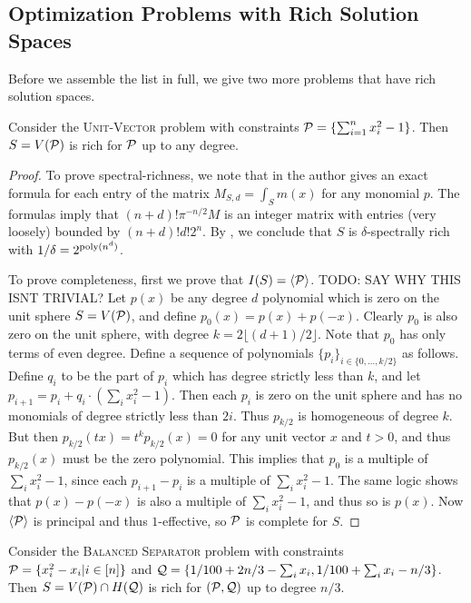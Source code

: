 \subsection{Optimization Problems with Rich Solution Spaces}
Before we assemble the list in full, we give two more problems that have rich solution spaces.
\begin{lemma}
Consider the \textsc{Unit-Vector} problem with constraints $\mathcal P = \{\sum_{i=1}^n x_i^2 - 1\}$. Then $S = V(\mathcal P)$ is rich for $\mathcal P$ up to any degree. 
\end{lemma}
\begin{proof}
To prove spectral-richness, we note that in \cite{10.2307/2695802} the author gives an exact formula for each entry of the matrix $M_{S,d} = \int_{S} m(x)$ for any monomial $p$. The formulas imply that $(n+d)!\pi^{-n/2} M$ is an integer matrix with entries (very loosely) bounded by $(n+d)!d!2^n$. By , we conclude that $S$ is $\delta$-spectrally rich with $1/\delta = 2^{\operatorname{poly}(n^d)}$.

To prove completeness, first we prove that $I(S) = \langle \mathcal P \rangle$. TODO: SAY WHY THIS ISNT TRIVIAL? Let $p(x)$ be any degree $d$ polynomial which is zero on the unit sphere $S = V(\mathcal P)$, and define $p_0(x) = p(x) + p(-x)$. Clearly $p_0$ is also zero on the unit sphere, with degree $k = 2\lfloor (d+1)/2 \rfloor$. Note that $p_0$ has only terms of even degree. 
%
Define a sequence of polynomials $\{p_i\}_{i \in \{0,\ldots, k/2\}}$ as follows.
Define $q_i$ to be the part of $p_i$ which has degree strictly less than $k$, and let $p_{i+1} = p_i + q_i\cdot(\sum_i x_i^2 - 1)$. Then each $p_i$ is zero on the unit sphere and has no monomials of degree strictly less than $2i$. Thus $p_{k/2}$ is homogeneous of degree $k$. But then $p_{k/2}(tx) = t^kp_{k/2}(x) = 0$ for any unit vector $x$ and $t > 0$, and thus $p_{k/2}(x)$ must be the zero polynomial. This implies that $p_0$ is a multiple of $\sum_i x_i^2 - 1$, since each $p_{i+1} - p_i$ is a multiple of $\sum_i x_i^2 -1$. The same logic shows that $p(x) - p(-x)$ is also a multiple of $\sum_i x_i^2 - 1$, and thus so is $p(x)$. Now $\langle \mathcal P\rangle$ is principal and thus $1$-effective, so $\mathcal P$ is complete for $S$. 
\end{proof}
\begin{lemma}
Consider the \textsc{Balanced Separator} problem with constraints $\mathcal P = \{x_i^2 - x_i| i \in [n]\}$ and $\mathcal Q = \{1/100 + 2n/3 - \sum_i x_i, 1/100 + \sum_i x_i - n/3\}$. Then $S = V(\mathcal P) \cap H(\mathcal Q)$ is rich for $(\mathcal P, \mathcal Q)$ up to degree $n/3$.
\end{lemma}
